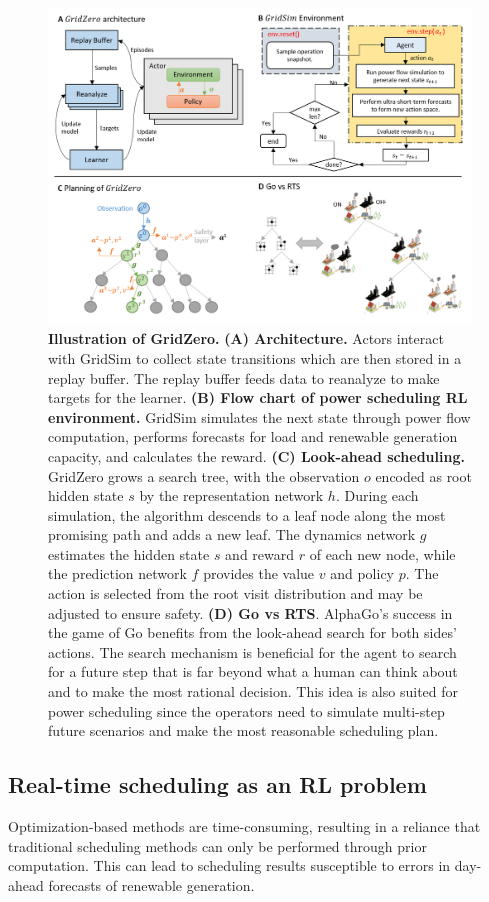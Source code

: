 \begin{figure}[h]
  \centering
  \includegraphics[width=0.9\linewidth]{fig/nature_fig6.png}
  \caption{\textbf{Illustration of GridZero.}
  \textbf{(A) Architecture.}  
  Actors interact with GridSim to collect state transitions which are then stored in a replay buffer. The replay buffer feeds data to reanalyze to make targets for the learner.
  \textbf{(B) Flow chart of power scheduling RL environment.} 
  GridSim simulates the next state through power flow computation, performs forecasts for load and renewable generation capacity, and calculates the reward.
  \textbf{(C) Look-ahead scheduling.} GridZero grows a search tree, with the observation $o$ encoded as root hidden state $s$ by the representation network $h$. During each simulation, the algorithm descends to a leaf node along the most promising path and adds a new leaf. The dynamics network $g$ estimates the hidden state $s$ and reward $r$ of each new node, while the prediction network $f$ provides the value $v$ and policy $p$. The action is selected from the root visit distribution and may be adjusted to ensure safety.
  \textbf{(D) Go vs RTS}. AlphaGo's success in the game of Go benefits from the look-ahead search for both sides' actions. The search mechanism is beneficial for the agent to search for a future step that is far beyond what a human can think about and to make the most rational decision. This idea is also suited for power scheduling since the operators need to simulate multi-step future scenarios and make the most reasonable scheduling plan. 
  } 
  \label{fig:nature_fig1}
\end{figure}


\subsection*{Real-time scheduling as an RL problem}
Optimization-based methods are time-consuming, resulting in a reliance that traditional scheduling methods can only be performed through prior computation.
This can lead to scheduling results susceptible to errors in day-ahead forecasts of renewable generation. 

